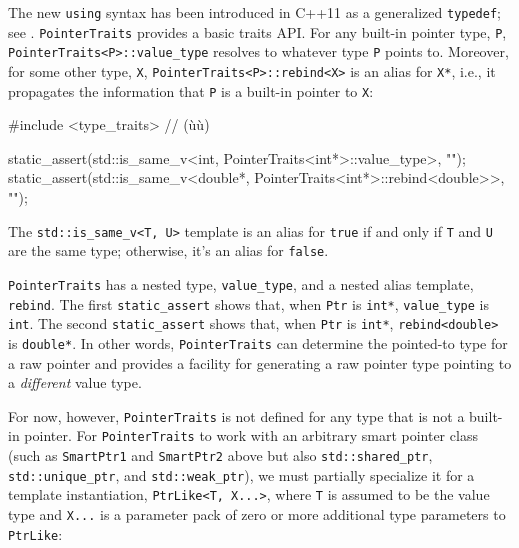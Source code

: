 \noindent The new \lstinline!using! syntax has been introduced in C++11 as a
generalized \lstinline!typedef!; see . \lstinline!PointerTraits! provides a basic
traits API. For any built-in pointer type, \lstinline!P!,
\lstinline!PointerTraits<P>::value_type! resolves to whatever type
\lstinline!P! points to. Moreover, for some other type, \lstinline!X!,
\lstinline!PointerTraits<P>::rebind<X>! is an alias for \lstinline!X*!, i.e.,
it propagates the information that \lstinline!P! is a built-in pointer to
\lstinline!X!:

\begin{emcppslisting}
#include <type_traits>  // (ù{}ù)

static_assert(std::is_same_v<int, PointerTraits<int*>::value_type>, "");
static_assert(std::is_same_v<double*,
                           PointerTraits<int*>::rebind<double>>, "");
\end{emcppslisting}
    

\noindent The \lstinline!std::is_same_v<T,!~\lstinline!U>! template is an alias for
\lstinline!true! if and only if \lstinline!T! and \lstinline!U! are the same
type; otherwise, it's an alias for \lstinline!false!.

\lstinline!PointerTraits! has a nested type, \lstinline!value_type!, and a
nested alias template, \lstinline!rebind!. The first
\lstinline!static_assert! shows that, when \lstinline!Ptr! is \lstinline!int*!,
\lstinline!value_type! is \lstinline!int!. The second \lstinline!static_assert!
shows that, when \lstinline!Ptr! is \lstinline!int*!, \lstinline!rebind<double>!
is \lstinline!double*!. In other words, \lstinline!PointerTraits! can
determine the pointed-to type for a raw pointer and provides a facility
for generating a raw pointer type pointing to a \emph{different} value
type.

For now, however, \lstinline!PointerTraits! is not defined for any type
that is not a built-in pointer. For \lstinline!PointerTraits! to work with
an arbitrary smart pointer class (such as \lstinline!SmartPtr1! and
\lstinline!SmartPtr2! above but also \lstinline!std::shared_ptr!,
\lstinline!std::unique_ptr!, and \lstinline!std::weak_ptr!), we must
partially specialize it for a template instantiation,
\lstinline!PtrLike<T,!~\lstinline!X...>!, where \lstinline!T! is assumed to be
the value type and \lstinline!X...! is a parameter pack of zero or more
additional type parameters to \lstinline!PtrLike!:

